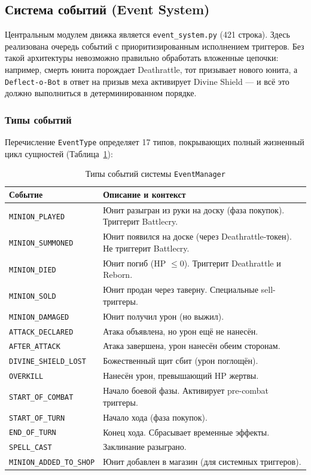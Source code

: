 \documentclass[a4paper,12pt]{extarticle}
\begin{document}
\subsection{Система событий (Event System)}

Центральным модулем движка является \texttt{event\_system.py} (421 строка). Здесь реализована очередь событий с приоритизированным исполнением триггеров. Без такой архитектуры невозможно правильно обработать вложенные цепочки: например, смерть юнита порождает Deathrattle, тот призывает нового юнита, а \texttt{Deflect-o-Bot} в ответ на призыв меха активирует Divine Shield --- и всё это должно выполниться в детерминированном порядке.

\subsubsection{Типы событий}

Перечисление \texttt{EventType} определяет 17 типов, покрывающих полный жизненный цикл сущностей (Таблица~\ref{tab:event_types}):

\begin{longtable}{p{5cm}p{9cm}}
\caption{Типы событий системы \texttt{EventManager}}\label{tab:event_types}\\
\toprule
\textbf{Событие} & \textbf{Описание и контекст} \\
\midrule
\texttt{MINION\_PLAYED} & Юнит разыгран из руки на доску (фаза покупок). Триггерит Battlecry. \\
\texttt{MINION\_SUMMONED} & Юнит появился на доске (через Deathrattle-токен). Не триггерит Battlecry. \\
\texttt{MINION\_DIED} & Юнит погиб (HP $\leq 0$). Триггерит Deathrattle и Reborn. \\
\texttt{MINION\_SOLD} & Юнит продан через таверну. Специальные sell-триггеры. \\
\texttt{MINION\_DAMAGED} & Юнит получил урон (но выжил). \\
\texttt{ATTACK\_DECLARED} & Атака объявлена, но урон ещё не нанесён. \\
\texttt{AFTER\_ATTACK} & Атака завершена, урон нанесён обеим сторонам. \\
\texttt{DIVINE\_SHIELD\_LOST} & Божественный щит сбит (урон поглощён). \\
\texttt{OVERKILL} & Нанесён урон, превышающий HP жертвы. \\
\texttt{START\_OF\_COMBAT} & Начало боевой фазы. Активирует pre-combat триггеры. \\
\texttt{START\_OF\_TURN} & Начало хода (фаза покупок). \\
\texttt{END\_OF\_TURN} & Конец хода. Сбрасывает временные эффекты. \\
\texttt{SPELL\_CAST} & Заклинание разыграно. \\
\texttt{MINION\_ADDED\_TO\_SHOP} & Юнит добавлен в магазин (для системных триггеров). \\
\bottomrule
\end{longtable}
\end{document}
